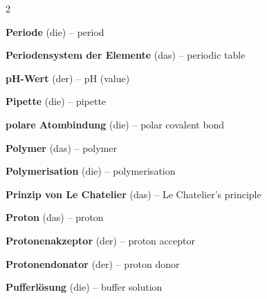 \begin{multicols}{2}
\par\nopagebreak
\textbf{Periode} (die) -- period\dotfill\hyperref[e:86]{\pageref*{e:86}}\par
\textbf{Periodensystem der Elemente} (das) -- periodic table\dotfill\hyperref[e:85]{\pageref*{e:85}}\par
\textbf{pH-Wert} (der) -- pH (value)\dotfill\hyperref[e:158]{\pageref*{e:158}}\par
\textbf{Pipette} (die) -- pipette\dotfill\hyperref[e:50]{\pageref*{e:50}}\par
\textbf{polare Atombindung} (die) -- polar covalent bond\dotfill\hyperref[e:116]{\pageref*{e:116}}\par
\textbf{Polymer} (das) -- polymer\dotfill\hyperref[e:237]{\pageref*{e:237}}\par
\textbf{Polymerisation} (die) -- polymerisation\dotfill\hyperref[e:238]{\pageref*{e:238}}\par
\textbf{Prinzip von Le Chatelier} (das) -- Le Chatelier's principle\dotfill\hyperref[e:148]{\pageref*{e:148}}\par
\textbf{Proton} (das) -- proton\dotfill\hyperref[e:74]{\pageref*{e:74}}\par
\textbf{Protonenakzeptor} (der) -- proton acceptor\dotfill\hyperref[e:163]{\pageref*{e:163}}\par
\textbf{Protonendonator} (der) -- proton donor\dotfill\hyperref[e:162]{\pageref*{e:162}}\par
\textbf{Pufferlösung} (die) -- buffer solution\dotfill\hyperref[e:177]{\pageref*{e:177}}\par


\end{multicols}
